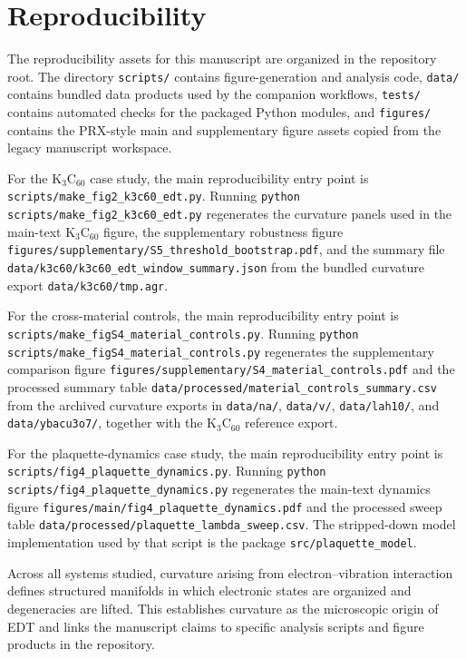 \section{Reproducibility}

The reproducibility assets for this manuscript are organized in the repository root. The directory \texttt{scripts/} contains figure-generation and analysis code, \texttt{data/} contains bundled data products used by the companion workflows, \texttt{tests/} contains automated checks for the packaged Python modules, and \texttt{figures/} contains the PRX-style main and supplementary figure assets copied from the legacy manuscript workspace.

For the K$_3$C$_{60}$ case study, the main reproducibility entry point is \texttt{scripts/make\_fig2\_k3c60\_edt.py}. Running \texttt{python scripts/make\_fig2\_k3c60\_edt.py} regenerates the curvature panels used in the main-text K$_3$C$_{60}$ figure, the supplementary robustness figure \texttt{figures/supplementary/S5\_threshold\_bootstrap.pdf}, and the summary file \texttt{data/k3c60/k3c60\_edt\_window\_summary.json} from the bundled curvature export \texttt{data/k3c60/tmp.agr}.

For the cross-material controls, the main reproducibility entry point is \texttt{scripts/make\_figS4\_material\_controls.py}. Running \texttt{python scripts/make\_figS4\_material\_controls.py} regenerates the supplementary comparison figure \texttt{figures/supplementary/S4\_material\_controls.pdf} and the processed summary table \texttt{data/processed/material\_controls\_summary.csv} from the archived curvature exports in \texttt{data/na/}, \texttt{data/v/}, \texttt{data/lah10/}, and \texttt{data/ybacu3o7/}, together with the K$_3$C$_{60}$ reference export.

For the plaquette-dynamics case study, the main reproducibility entry point is \texttt{scripts/fig4\_plaquette\_dynamics.py}. Running \texttt{python scripts/fig4\_plaquette\_dynamics.py} regenerates the main-text dynamics figure \texttt{figures/main/fig4\_plaquette\_dynamics.pdf} and the processed sweep table \texttt{data/processed/plaquette\_lambda\_sweep.csv}. The stripped-down model implementation used by that script is the package \texttt{src/plaquette\_model}.

Across all systems studied, curvature arising from electron--vibration interaction defines structured manifolds in which electronic states are organized and degeneracies are lifted. This establishes curvature as the microscopic origin of EDT and links the manuscript claims to specific analysis scripts and figure products in the repository.
